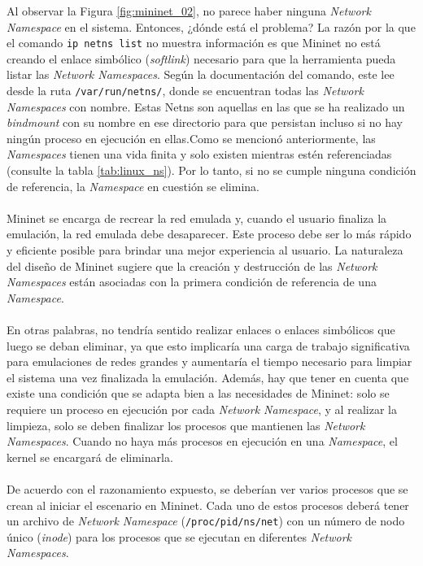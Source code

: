 Al observar la Figura \ref{fig:mininet_02}, no parece haber ninguna \textit{Network Namespace} en el sistema. Entonces, ¿dónde está el problema? La razón por la que el comando \texttt{ip netns list} no muestra información es que Mininet no está creando el enlace simbólico (\textit{softlink}) necesario para que la herramienta pueda listar las \textit{Network Namespaces}. Según la documentación del comando, este lee desde la ruta \texttt{/var/run/netns/}, donde se encuentran todas las \textit{Network Namespaces} con nombre. Estas Netns son aquellas en las que se ha realizado un \textit{bindmount} con su nombre en ese directorio para que persistan incluso si no hay ningún proceso en ejecución en ellas.Como se mencionó anteriormente, las \textit{Namespaces} tienen una vida finita y solo existen mientras estén referenciadas (consulte la tabla \ref{tab:linux_ns}). Por lo tanto, si no se cumple ninguna condición de referencia, la \textit{Namespace} en cuestión se elimina.\\
\\
Mininet se encarga de recrear la red emulada y, cuando el usuario finaliza la emulación, la red emulada debe desaparecer. Este proceso debe ser lo más rápido y eficiente posible para brindar una mejor experiencia al usuario. La naturaleza del diseño de Mininet sugiere que la creación y destrucción de las \textit{Network Namespaces} están asociadas con la primera condición de referencia de una \textit{Namespace}.\\
\\
En otras palabras, no tendría sentido realizar enlaces o enlaces simbólicos que luego se deban eliminar, ya que esto implicaría una carga de trabajo significativa para emulaciones de redes grandes y aumentaría el tiempo necesario para limpiar el sistema una vez finalizada la emulación. Además, hay que tener en cuenta que existe una condición que se adapta bien a las necesidades de Mininet: solo se requiere un proceso en ejecución por cada \textit{Network Namespace}, y al realizar la limpieza, solo se deben finalizar los procesos que mantienen las \textit{Network Namespaces}. Cuando no haya más procesos en ejecución en una \textit{Namespace}, el kernel se encargará de eliminarla.\\
\\
De acuerdo con el razonamiento expuesto, se deberían ver varios procesos que se crean al iniciar el escenario en Mininet. Cada uno de estos procesos deberá tener un archivo de \textit{Network Namespace} (\texttt{/proc/{pid}/ns/net}) con un número de nodo único (\textit{inode}) para los procesos que se ejecutan en diferentes \textit{Network Namespaces}.\\

